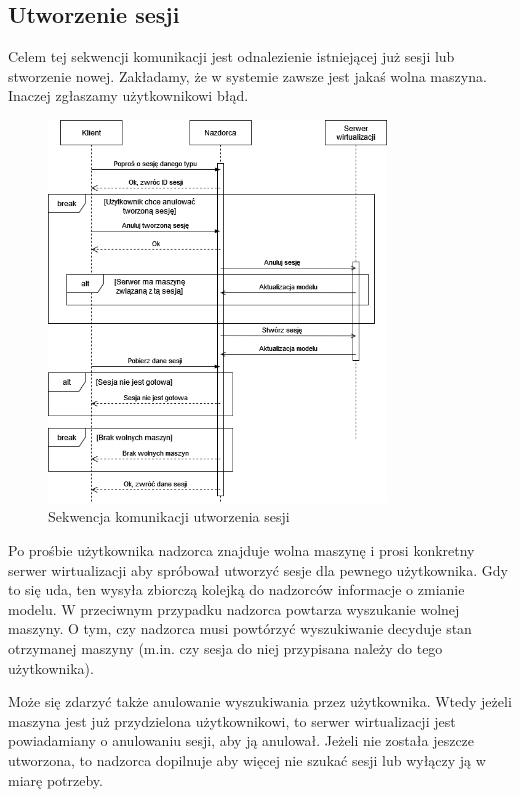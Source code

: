 \documentclass[../opis-rozwiazania.tex]{subfiles}
\begin{document}
\label{communication-sec}

\subsection{Utworzenie sesji}

Celem tej sekwencji komunikacji jest odnalezienie istniejącej już sesji lub stworzenie nowej.
Zakładamy, że w systemie zawsze jest jakaś wolna maszyna.
Inaczej zgłaszamy użytkownikowi błąd.

\begin{figure}[H]
    \centering
    \includegraphics[width=0.8\textwidth]{../diagrams/sequence_diagrams/tworzenie_sesji_v2.png}
    \caption{Sekwencja komunikacji utworzenia sesji}
    \label{figure:diagrams:sequence_diagrams:tworzenie_sesji}
\end{figure}

Po prośbie użytkownika nadzorca znajduje wolna maszynę i prosi konkretny serwer wirtualizacji aby spróbował utworzyć sesje dla pewnego użytkownika.
Gdy to się uda, ten wysyła zbiorczą kolejką do nadzorców informacje o zmianie modelu.
W przeciwnym przypadku nadzorca powtarza wyszukanie wolnej maszyny.
O tym, czy nadzorca musi powtórzyć wyszukiwanie decyduje stan otrzymanej maszyny (m.in. czy sesja do niej przypisana należy do tego użytkownika).

Może się zdarzyć także anulowanie wyszukiwania przez użytkownika.
Wtedy jeżeli maszyna jest już przydzielona użytkownikowi, to serwer wirtualizacji jest powiadamiany o anulowaniu sesji, aby ją anulował.
Jeżeli nie została jeszcze utworzona, to nadzorca dopilnuje aby więcej nie szukać sesji lub wyłączy ją w miarę potrzeby.
\end{document}
